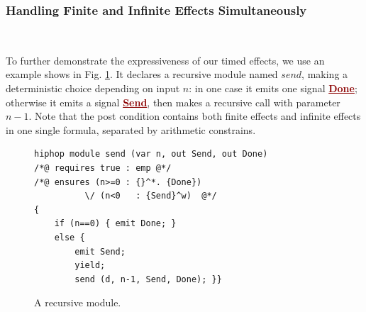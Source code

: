 \documentclass[acmsmall,review,anonymous]{acmart}\settopmatter{printfolios=true,printccs=false,printacmref=false}
\newcommand{\anyevent}[1]{{\textcolor{darkred}
{\underline{\textbf{\footnotesize #1}}}}}
\newcommand{\code}[1]{{\tt{\ensuremath{\m{#1}}}}}
\newcommand{\m}{\mathit}
\newcommand\figref[1]{Fig. \textcolor{black}{\ref{#1}}.}
\begin{document}
\subsubsection{Handling Finite and Infinite Effects Simultaneously}~\\
\label{rec:finit_infinite}

      \vspace{-2mm}
To further demonstrate the expressiveness of our timed effects, we use an example shows in \figref{fig:case_study_finit_infinit}
It declares a recursive module named \code{send}, making a deterministic choice depending on input \code{n}: in one case it emits one  signal  \anyevent{Done}; otherwise it emits a signal 
\anyevent{Send}, then makes a recursive call with parameter \code{n{-}1}.  Note that the post condition contains both finite effects and infinite effects in one single formula, separated by arithmetic constrains. 




\begin{figure}
      \vspace{-2mm}
\begin{lstlisting}[columns=fullflexible]
hiphop module send (var n, out Send, out Done)
/*@ requires true : emp @*/
/*@ ensures	(n>=0 : {}^*. {Done}) 
          \/ (n<0   : {Send}^w)  @*/
{
	if (n==0) { emit Done; }
	else {
		emit Send;
		yield;
		send (d, n-1, Send, Done); }}
\end{lstlisting}  
      \vspace{-1mm}
      \caption{A recursive  module.}\label{fig:case_study_finit_infinit}
         \vspace{-2mm}
\end{figure}
\end{document}
